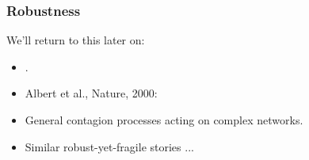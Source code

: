 \begin{frame}
  \frametitle{Robustness}


  \begin{block}{We'll return to this later on:}
    \begin{itemize}
    \item<1->
      .
    \item<1->
      Albert et al., Nature, 2000:\\
      \cite{albert2000a}
    \item<1->
      General contagion processes acting on complex networks.\cite{watts2002b,watts2007a}
    \item<1->
      Similar robust-yet-fragile stories ...
    \end{itemize}
  \end{block}

\end{frame}

